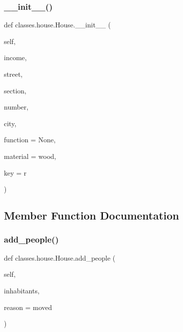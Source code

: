 \subsubsection{\texorpdfstring{\+\_\+\+\_\+init\+\_\+\+\_\+()}{\_\_init\_\_()}}
{\footnotesize\ttfamily def classes.\+house.\+House.\+\_\+\+\_\+init\+\_\+\+\_\+ (\begin{DoxyParamCaption}\item[{}]{self,  }\item[{}]{income,  }\item[{}]{street,  }\item[{}]{section,  }\item[{}]{number,  }\item[{}]{city,  }\item[{}]{function = {\ttfamily None},  }\item[{}]{material = {\ttfamily \textquotesingle{}wood\textquotesingle{}},  }\item[{}]{key = {\ttfamily \textquotesingle{}r\textquotesingle{}} }\end{DoxyParamCaption})}



\subsection{Member Function Documentation}
\mbox{\label{classclasses_1_1house_1_1House_af11348c0a57c36f5ca2c923d8c1db348}} 
\subsubsection{\texorpdfstring{add\+\_\+people()}{add\_people()}}
{\footnotesize\ttfamily def classes.\+house.\+House.\+add\+\_\+people (\begin{DoxyParamCaption}\item[{}]{self,  }\item[{}]{inhabitants,  }\item[{}]{reason = {\ttfamily \textquotesingle{}moved\textquotesingle{}} }\end{DoxyParamCaption})}

\mbox{\label{classclasses_1_1house_1_1House_a834356bf82f28e9e0c92738b0b9bccac}} 
